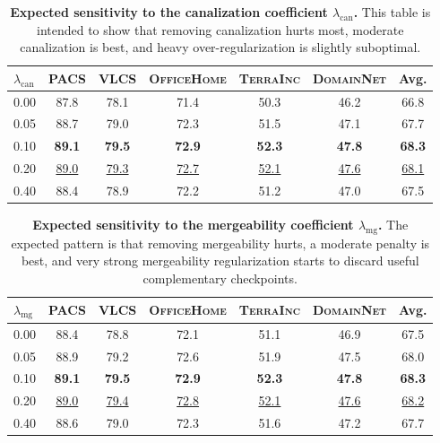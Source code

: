 \documentclass[10pt]{article}
\newcommand{\data}[1]{\textsc{#1}}
\newcommand{\Expected}[1]{#1}
\newcommand{\Best}[1]{\textbf{\Expected{#1}}}
\newcommand{\Second}[1]{\underline{\Expected{#1}}}
\begin{document}
\begin{table}[H]
\centering
\small
\caption{\textbf{Expected sensitivity to the canalization coefficient \(\lambda_{\mathrm{can}}\).} This table is intended to show that removing canalization hurts most, moderate canalization is best, and heavy over-regularization is slightly suboptimal.}
\label{tab:cda_lambda_can_expected}
\setlength{\tabcolsep}{5pt}
\begin{tabular}{lccccc|c}
\toprule
\(\lambda_{\mathrm{can}}\) & \data{PACS} & \data{VLCS} & \data{OfficeHome} & \data{TerraInc} & \data{DomainNet} & \textbf{Avg.} \\
\midrule
\Expected{0.00} & \Expected{87.8} & \Expected{78.1} & \Expected{71.4} & \Expected{50.3} & \Expected{46.2} & \Expected{66.8} \\
\Expected{0.05} & \Expected{88.7} & \Expected{79.0} & \Expected{72.3} & \Expected{51.5} & \Expected{47.1} & \Expected{67.7} \\
\Expected{0.10} & \Best{89.1} & \Best{79.5} & \Best{72.9} & \Best{52.3} & \Best{47.8} & \Best{68.3} \\
\Expected{0.20} & \Second{89.0} & \Second{79.3} & \Second{72.7} & \Second{52.1} & \Second{47.6} & \Second{68.1} \\
\Expected{0.40} & \Expected{88.4} & \Expected{78.9} & \Expected{72.2} & \Expected{51.2} & \Expected{47.0} & \Expected{67.5} \\
\bottomrule
\end{tabular}
\end{table}

\begin{table}[H]
\centering
\small
\caption{\textbf{Expected sensitivity to the mergeability coefficient \(\lambda_{\mathrm{mg}}\).} The expected pattern is that removing mergeability hurts, a moderate penalty is best, and very strong mergeability regularization starts to discard useful complementary checkpoints.}
\label{tab:cda_lambda_mg_expected}
\setlength{\tabcolsep}{5pt}
\begin{tabular}{lccccc|c}
\toprule
\(\lambda_{\mathrm{mg}}\) & \data{PACS} & \data{VLCS} & \data{OfficeHome} & \data{TerraInc} & \data{DomainNet} & \textbf{Avg.} \\
\midrule
\Expected{0.00} & \Expected{88.4} & \Expected{78.8} & \Expected{72.1} & \Expected{51.1} & \Expected{46.9} & \Expected{67.5} \\
\Expected{0.05} & \Expected{88.9} & \Expected{79.2} & \Expected{72.6} & \Expected{51.9} & \Expected{47.5} & \Expected{68.0} \\
\Expected{0.10} & \Best{89.1} & \Best{79.5} & \Best{72.9} & \Best{52.3} & \Best{47.8} & \Best{68.3} \\
\Expected{0.20} & \Second{89.0} & \Second{79.4} & \Second{72.8} & \Second{52.1} & \Second{47.6} & \Second{68.2} \\
\Expected{0.40} & \Expected{88.6} & \Expected{79.0} & \Expected{72.3} & \Expected{51.6} & \Expected{47.2} & \Expected{67.7} \\
\bottomrule
\end{tabular}
\end{table}
\end{document}
